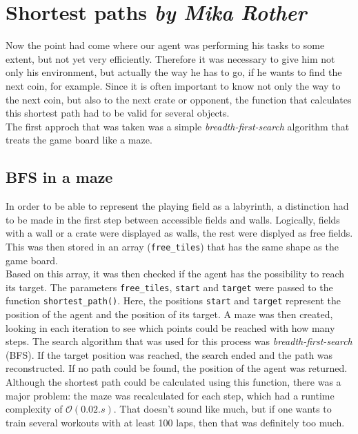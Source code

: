 \section[Shortest paths]{Shortest paths \hfill \small \normalfont\textit{by Mika Rother}}
Now the point had come where our agent was performing his tasks to some extent, but not yet very efficiently. Therefore it was necessary to give him not only his environment, but actually the way he has to go, if he wants to find the next coin, for example. Since it is often important to know not only the way to the next coin, but also to the next crate or opponent, the function that calculates this shortest path had to be valid for several objects.
\\

The first approch that was taken was a simple \textsl{breadth-first-search} algorithm that treats the game board like a maze.

\subsection{BFS in a maze}
In order to be able to represent the playing field as a labyrinth, a distinction had to be made in the first step between accessible fields and walls. Logically, fields with a wall or a crate were displayed as walls, the rest were displyed as free fields. This was then stored in an array (\texttt{free\_tiles}) that has the same shape as the game board. 
\\

Based on this array, it was then checked if the agent has the possibility to reach its target. The parameters \texttt{free\_tiles}, \texttt{start} and \texttt{target} were passed to the function \texttt{shortest\_path()}. Here, the positions \texttt{start} and \texttt{target} represent the position of the agent and the position of its target. A maze was then created, looking in each iteration to see which points could be reached with how many steps. The search algorithm that was used for this process was \textit{breadth-first-search} (BFS). If the target position was reached, the search ended and the path was reconstructed. If no path could be found, the position of the agent was returned. 
\\

Although the shortest path could be calculated using this function, there was a major problem: the maze was recalculated for each step, which had a runtime complexity of $\mathcal{O}(0.02\si{.s})$. That doesn't sound like much, but if one wants to train several workouts with at least 100 laps, then that was definitely too much.


